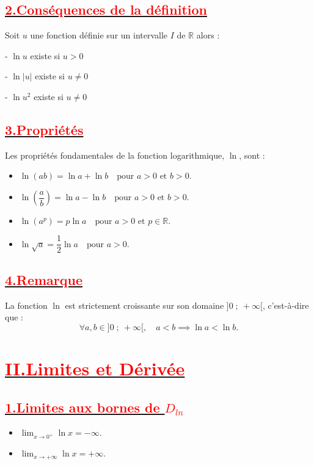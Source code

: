 \documentclass[12pt]{article}
\begin{document}
\subsection*{\underline{\textbf{\textcolor{red}{2.Conséquences de la définition}}}}
Soit $u$ une fonction définie sur un intervalle $I$ de $\mathbb{R}$ alors :

- $\ln u$ existe si $u > 0$

- $\ln |u|$ existe si $u \neq 0$

- $\ln u^{2}$ existe si $u \neq 0$

\subsection*{\underline{\textbf{\textcolor{red}{3.Propriétés}}}}
Les propriétés fondamentales de la fonction logarithmique, $\ln$, sont :
\begin{itemize}
    \item 
    \(
    \ln(ab) = \ln a + \ln b \quad \text{pour } a > 0 \text{ et } b > 0.
    \)
    \item 
    \(
    \ln\left(\dfrac{a}{b}\right) = \ln a - \ln b \quad \text{pour } a > 0 \text{ et } b > 0.
    \)
    \item 
    \(
    \ln(a^p) = p \ln a \quad \text{pour } a > 0 \text{ et } p \in \mathbb{R}.
    \)
    \item 
    \(
    \ln\sqrt{a} = \dfrac{1}{2} \ln a \quad \text{pour } a > 0.
    \)
\end{itemize}

\subsection*{\underline{\textbf{\textcolor{red}{4.Remarque}}}}
La fonction $\ln$ est strictement croissante sur son domaine $]0\;;\ +\infty[$, c'est-à-dire que :
\[
\forall a, b \in ]0\;;\ +\infty[, \quad a < b \implies \ln a < \ln b.
\]

\section*{\underline{\textbf{\textcolor{red}{II.Limites et Dérivée}}}}

\subsection*{\underline{\textbf{\textcolor{red}{1.Limites aux bornes de $D_{ln}$}}}}
\begin{itemize}
    \item $\lim_{x \to 0^+} \ln x = -\infty$.
    \item $\lim_{x \to +\infty} \ln x = +\infty$.
\end{itemize}
\end{document}
